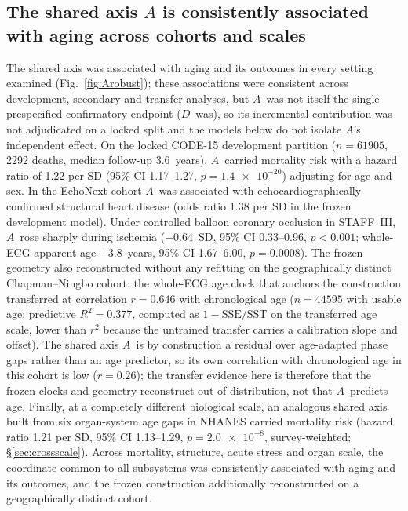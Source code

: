 \documentclass[11pt]{article}
\newcommand{\D}{\ensuremath{D}}
\newcommand{\A}{\ensuremath{A}}
\begin{document}
\subsection{The shared axis \texorpdfstring{\A}{A} is consistently associated with aging across cohorts and scales}
\label{sec:shared}

The shared axis was associated with aging and its outcomes in every setting
examined (Fig.~\ref{fig:Arobust}); these associations were consistent across development,
secondary and transfer analyses, but \A\ was not itself the single prespecified
confirmatory endpoint (\D\ was), so its incremental contribution was not adjudicated on a
locked split and the models below do not isolate \A's independent effect. On the locked CODE-15 development partition
($n=\num{61905}$, \num{2292} deaths, median follow-up \num{3.6}~years), \A\ carried
mortality risk with a hazard ratio of \num{1.22} per SD (95\% CI
\numrange{1.17}{1.27}, $p=\num{1.4e-20}$) adjusting for age and sex. In the EchoNext
cohort \A\ was associated with echocardiographically confirmed structural heart
disease (odds ratio \num{1.38} per SD in the frozen development model). Under
controlled balloon coronary occlusion in STAFF~III, \A\ rose sharply during ischemia
($+\num{0.64}$~SD, 95\% CI \numrange{0.33}{0.96}, $p<\num{0.001}$; whole-ECG apparent
age $+\num{3.8}$~years, 95\% CI \numrange{1.67}{6.00}, $p=\num{0.0008}$). The frozen
geometry also reconstructed without any refitting on the geographically distinct
Chapman--Ningbo cohort: the whole-ECG age clock that anchors the construction transferred
at correlation $r=\num{0.646}$ with chronological age ($n=\num{44595}$ with usable age;
predictive $R^2=\num{0.377}$, computed as $1-\text{SSE}/\text{SST}$ on the transferred age
scale, lower than $r^2$ because the untrained transfer carries a calibration slope and
offset). The shared axis \A\ is by construction a residual over age-adapted phase gaps
rather than an age predictor, so its own correlation with chronological age in this cohort
is low ($r=\num{0.26}$); the transfer evidence here is therefore that the frozen clocks and
geometry reconstruct out of distribution, not that \A\ predicts age. Finally, at a
completely different biological
scale, an analogous shared axis built from six organ-system age gaps in NHANES
carried mortality risk (hazard ratio \num{1.21} per SD, 95\% CI \numrange{1.13}{1.29},
$p=\num{2.0e-8}$, survey-weighted; \S\ref{sec:crossscale}). Across mortality,
structure, acute stress and organ scale, the coordinate common to all
subsystems was consistently associated with aging and its outcomes, and the frozen
construction additionally reconstructed on a geographically distinct cohort.
\end{document}
